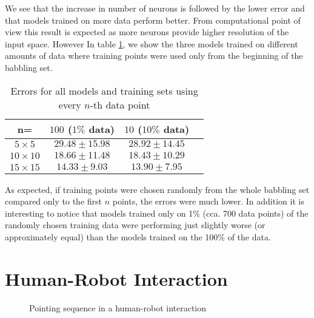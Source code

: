 We see that the increase in number of neurons is followed by the lower error and that  models trained on more data perform better. From computational point of view this result is expected as more neurons provide higher resolution of the input space. However
In table \ref{lab:table_trainu}, we show the three models trained on different amounts of data where training points were used only from the beginning of the babbling set.

\renewcommand{\arraystretch}{1.5}
\begin{table}[h]\footnotesize
\begin{center} 
 \caption{Errors for all models and training sets using every $n$-th data point}
 \label{lab:table_trainu}
 \begin{tabular}{|c|c|c|c|}
   \hline     
    n= & $100$ ($1\%$ data) & $10$ ($10\%$ data)\\ \hline
   $5\times 5$ & $29.48 \pm 15.98$ & $28.92 \pm 14.45$  \\ \hline
   $10\times 10$ & $18.66 \pm 11.48$ & $18.43 \pm 10.29$ \\ \hline
   $15\times 15$ & $14.33 \pm 9.03$  & $13.90 \pm 7.95$\\  
   \hline
 \end{tabular}
\end{center}
\end{table}

As expected, if training points were chosen randomly from the whole babbling set compared only to the first $n$ points, the errors were much lower. 
In addition it is interesting to notice that models trained only on 1\% (cca. 700 data points) of the randomly chosen training data were performing just slightly worse (or approximately equal) than the models trained on the 100\% of the data. 

\section{Human-Robot Interaction}
\label{sec:exp-hri}

\begin{figure}[h]
\centering
{}
\caption{Pointing sequence in a human-robot interaction}
\label{lab:experiment}
\end{figure}

